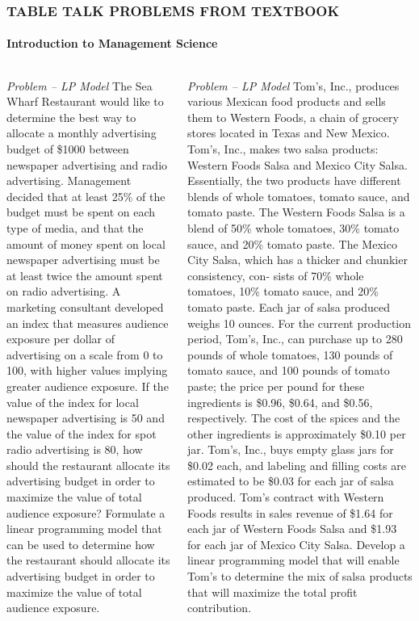\documentclass[14 pt]{beamer}
\begin{document}

\begin{frame}[t]
\frametitle{TABLE TALK PROBLEMS FROM TEXTBOOK}
\framesubtitle{Introduction to Management Science}

\begin{columns}[t]
\begin{column}{0.45\textwidth}
\emph{Problem -- LP Model}
\vskip0.5cm%
The Sea Wharf Restaurant would like to determine the best way to allocate a monthly advertising budget of \$1000 between newspaper advertising and radio advertising. Management decided that at least 25\% of the budget must be spent on each type of media, and that the amount of money spent on local newspaper advertising must be at least twice the amount spent on radio advertising. A marketing consultant developed an index that measures audience exposure per dollar of advertising on a scale from 0 to 100, with higher values implying greater audience exposure. If the value of the index for local newspaper advertising is 50 and the value of the index for spot radio advertising is 80, how should the restaurant allocate its advertising budget in order to maximize the value of total audience exposure?
\vskip0.5cm%
Formulate a linear programming model that can be used to determine how the restaurant should allocate its advertising budget in order to maximize the value of total audience exposure.
\end{column}

\begin{column}{0.45\textwidth}
\emph{Problem -- LP Model}
\vskip0.5cm%
Tom’s, Inc., produces various Mexican food products and sells them to Western Foods, a chain of grocery stores located in Texas and New Mexico. Tom’s, Inc., makes two salsa products: Western Foods Salsa and Mexico City Salsa. Essentially, the two products have different blends of whole tomatoes, tomato sauce, and tomato paste. The Western Foods Salsa is a blend of 50\% whole tomatoes, 30\% tomato sauce, and 20\% tomato paste. The Mexico City Salsa, which has a thicker and chunkier consistency, con- sists of 70\% whole tomatoes, 10\% tomato sauce, and 20\% tomato paste. Each jar of salsa produced weighs 10 ounces. For the current production period, Tom’s, Inc., can purchase up to 280 pounds of whole tomatoes, 130 pounds of tomato sauce, and 100 pounds of tomato paste; the price per pound for these ingredients is \$0.96, \$0.64, and \$0.56, respectively. The cost of the spices and the other ingredients is approximately \$0.10 per jar. Tom’s, Inc., buys empty glass jars for \$0.02 each, and labeling and filling costs are estimated to be \$0.03 for each jar of salsa produced. Tom’s contract with Western Foods results in sales revenue of \$1.64 for each jar of Western Foods Salsa and \$1.93 for each jar of Mexico City Salsa.
\vskip0.5cm%
Develop a linear programming model that will enable Tom’s to determine the mix of salsa products that will maximize the total profit contribution.
\end{column}
\end{columns}
\end{frame}
\end{document}
